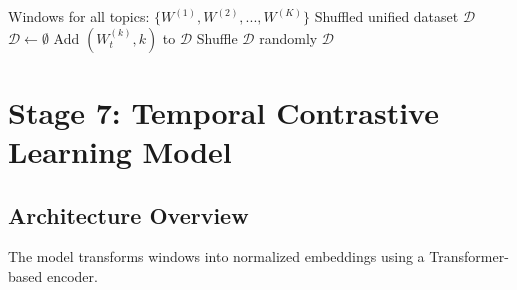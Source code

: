 \documentclass[12pt]{article}
\begin{document}
\begin{algorithm}[H]
\caption{Unified Dataset Construction}
\begin{algorithmic}[1]
\REQUIRE Windows for all topics: $\{W^{(1)}, W^{(2)}, ..., W^{(K)}\}$
\ENSURE Shuffled unified dataset $\mathcal{D}$
\STATE $\mathcal{D} \leftarrow \emptyset$
        \STATE Add $(W_t^{(k)}, k)$ to $\mathcal{D}$
    \ENDFOR
\ENDFOR
\STATE Shuffle $\mathcal{D}$ randomly
\RETURN $\mathcal{D}$
\end{algorithmic}
\end{algorithm}

\newpage

\section{Stage 7: Temporal Contrastive Learning Model}

\subsection{Architecture Overview}

The model transforms windows into normalized embeddings using a Transformer-based encoder.
\end{document}
